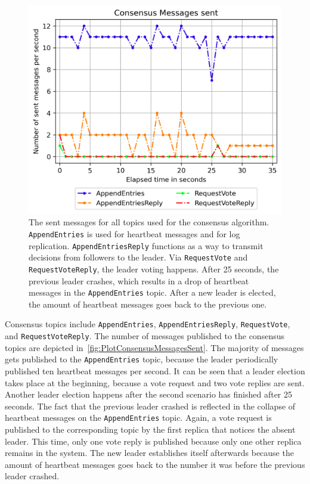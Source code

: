 \begin{figure}[!hb]
	\centering
	\includegraphics[width=0.75\linewidth]{images/plots/ConsensusMessagesSent}
	\caption{The sent messages for all topics used for the consensus algorithm. \texttt{AppendEntries} is used for heartbeat messages and for log replication. \texttt{AppendEntriesReply} functions as a way to transmit decisions from followers to the leader. Via \texttt{RequestVote} and \texttt{RequestVoteReply}, the leader voting happens. After 25 seconds, the previous leader crashes, which results in a drop of heartbeat messages in the \texttt{AppendEntries} topic. After a new leader is elected, the amount of heartbeat messages goes back to the previous one.}
	\label{fig:PlotConsensusMessagesSent}
\end{figure}

Consensus topics include \texttt{AppendEntries}, \texttt{AppendEntriesReply}, \texttt{RequestVote}, and \texttt{RequestVoteReply}.
The number of messages published to the consensus topics are depicted in~\autoref{fig:PlotConsensusMessagesSent}.
The majority of messages gets published to the \texttt{AppendEntries} topic, because the leader periodically published ten heartbeat messages per second.
It can be seen that a leader election takes place at the beginning, because a vote request and two vote replies are sent.
Another leader election happens after the second scenario has finished after 25 seconds.
The fact that the previous leader crashed is reflected in the collapse of heartbeat messages on the \texttt{AppendEntries} topic.
Again, a vote request is published to the corresponding topic by the first replica that notices the absent leader.
This time, only one vote reply is published because only one other replica remains in the system.
The new leader establishes itself afterwards because the amount of heartbeat messages goes back to the number it was before the previous leader crashed.



